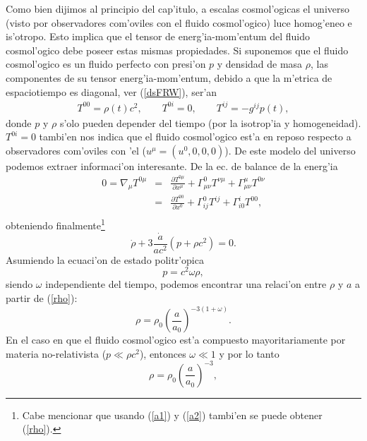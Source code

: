 Como bien dijimos al principio del cap'itulo, a escalas cosmol'ogicas el universo (visto por observadores com'oviles con el fluido cosmol'ogico) luce homog'eneo e is'otropo. 
Esto implica que el tensor de energ'ia-mom'entum del fluido cosmol'ogico debe poseer estas mismas propiedades. Si suponemos que
el fluido cosmol'ogico es un fluido perfecto con presi'on $p$ y densidad de masa $\rho$, las componentes de su tensor energ'ia-mom'entum, debido a que la m'etrica
de espaciotiempo  es diagonal, ver (\ref{dsFRW}), ser'an
\begin{eqnarray}
T^{00}=\rho(t)c^2,\qquad T^{0i}=0, \qquad T^{ij}= -g^{ij}p(t),
\end{eqnarray}
donde $p$ y $\rho$ s'olo pueden depender del tiempo (por la isotrop'ia y homogeneidad). $T^{0i}=0$ tambi'en nos indica que el fluido cosmol'ogico
est'a en reposo respecto a observadores com'oviles con 'el ($u^\mu=(u^0,0,0,0)$).
De este modelo del universo podemos extraer informaci'on interesante. De la ec. de balance de la energ'ia %
\begin{eqnarray}
0 = \nabla_\mu T^{0\mu}&=& \frac{\partial T^{0\mu}}{\partial x^\mu} + \Gamma^{0}_{\mu\nu} T^{\nu \mu} + \Gamma^{\mu}_{\mu \nu} T^{0\nu}\\
                   &=& \frac{\partial T^{00}}{\partial x^0} + \Gamma^{0}_{ij} T^{ij} + \Gamma^{i}_{i0} T^{00},\\
\end{eqnarray}
obteniendo finalmente\footnote{Cabe mencionar que usando (\ref{a1}) y (\ref{a2}) tambi'en se puede obtener (\ref{rho}).}
\begin{equation}
\boxed{\dot \rho +3\frac{\dot a}{ac^2}(p+\rho c^2)= 0.} \label{rho} 
\end{equation}
Asumiendo la ecuaci'on de estado politr'opica
\begin{equation}
p=c^2\omega \rho,
\end{equation}
siendo $\omega$ independiente del tiempo, podemos encontrar una relaci'on entre $\rho$ y $a$ a partir de (\ref{rho}):
\begin{equation}
\rho =\rho_0 \left(\frac{a}{a_0}\right)^{-3(1+\omega)}.
\end{equation}
En el caso en que el fluido cosmol'ogico est'a compuesto mayoritariamente por materia no-relativista ($p\ll \rho c^{2}$), entonces $\omega \ll 1$ y por lo tanto
\begin{equation}
\rho =\rho_0 \left(\frac{a}{a_0}\right)^{-3}, \label{materia}
\end{equation}
